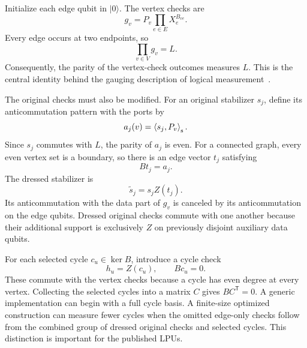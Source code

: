 \documentclass[11pt,a4paper]{article}
\newcommand{\symp}[2]{\left\langle #1,#2\right\rangle_{\rm s}}
\begin{document}
Initialize each edge qubit in $\lvert0\rangle$. The vertex checks are
\begin{equation}
 g_v=P_v\prod_{e\in E}X_e^{B_{ve}}.
 \label{eq:vertex}
\end{equation}
Every edge occurs at two endpoints, so
\begin{equation}
 \prod_{v\in V}g_v=L.
 \label{eq:product}
\end{equation}
Consequently, the parity of the vertex-check outcomes measures $L$. This is the central identity behind the gauging description of logical measurement~\cite{gauging,tdg}.

The original checks must also be modified. For an original stabilizer $s_j$, define its anticommutation pattern with the ports by
\begin{equation}
 a_j(v)=\symp{s_j}{P_v}.
\end{equation}
Since $s_j$ commutes with $L$, the parity of $a_j$ is even. For a connected graph, every even vertex set is a boundary, so there is an edge vector $t_j$ satisfying
\begin{equation}
 B t_j=a_j.
 \label{eq:dresssolve}
\end{equation}
The dressed stabilizer is
\begin{equation}
 \widetilde{s}_j=s_j Z(t_j).
 \label{eq:dressed}
\end{equation}
Its anticommutation with the data part of $g_v$ is canceled by its anticommutation on the edge qubits. Dressed original checks commute with one another because their additional support is exclusively $Z$ on previously disjoint auxiliary data qubits.

For each selected cycle $c_u\in\ker B$, introduce a cycle check
\begin{equation}
 h_u=Z(c_u),\qquad Bc_u=0.
 \label{eq:cycle}
\end{equation}
These commute with the vertex checks because a cycle has even degree at every vertex. Collecting the selected cycles into a matrix $C$ gives $BC^{\mathsf T}=0$. A generic implementation can begin with a full cycle basis. A finite-size optimized construction can measure fewer cycles when the omitted edge-only checks follow from the combined group of dressed original checks and selected cycles. This distinction is important for the published LPUs.
\end{document}

